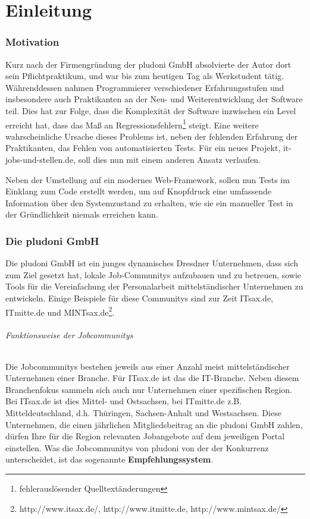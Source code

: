 \part{Einleitung}
\label{sec:intro}
\section{Motivation}

Kurz nach der Firmengründung der pludoni GmbH absolvierte der Autor dort sein Pflichtpraktikum, und war bis zum heutigen Tag als Werkstudent tätig.
Währenddessen nahmen Programmierer verschiedener Erfahrungsstufen und insbesondere auch Praktikanten an der Neu- und Weiterentwicklung der Software teil. Dies hat zur Folge, dass die Komplexität der Software inzwischen ein Level erreicht hat, dass das Maß an Regressionsfehlern\footnote{fehlerauslösender Quelltextänderungen} steigt. Eine weitere wahrscheinliche Ursache dieses Problems ist, neben der fehlenden Erfahrung der Praktikanten, das Fehlen von automatisierten Tests.
Für ein neues Projekt, it-jobs-und-stellen.de, soll dies nun mit einem anderen Ansatz verlaufen. 

Neben der Umstellung auf ein modernes Web-Framework, sollen nun Tests im Einklang zum Code erstellt werden, um auf Knopfdruck eine umfassende Information über den Systemzustand zu erhalten, wie sie ein manueller Test in der Gründlichkeit niemals erreichen kann.

\section{Die pludoni GmbH}

Die pludoni GmbH ist ein junges dynamisches Dresdner Unternehmen, dass sich zum Ziel gesetzt hat, lokale Job-Communitys aufzubauen und zu betreuen, sowie Tools für die Vereinfachung der Personalarbeit mittelständischer Unternehmen zu entwickeln. Einige Beispiele für diese Communitys sind zur Zeit ITsax.de, ITmitte.de und MINTsax.de\footnote{http://www.itsax.de/, http://www.itmitte.de, http://www.mintsax.de/}.

\paragraph{Funktionsweise der Jobcommunitys}
Die Jobcommunitys bestehen jeweils aus einer Anzahl meist mittelständischer Unternehmen einer Branche. Für ITsax.de ist das die IT-Branche. Neben diesem Branchenfokus sammeln sich auch nur Unternehmen einer spezifischen Region. Bei ITsax.de ist dies Mittel- und Ostsachsen, bei ITmitte.de z.B. Mitteldeutschland, d.h. Thüringen, Sachsen-Anhalt und Westsachsen. 
Diese Unternehmen, die einen jährlichen Mitgliedsbeitrag an die pludoni GmbH zahlen, dürfen Ihre für die Region relevanten Jobangebote auf dem jeweiligen Portal einstellen. Was die Jobcommunitys von pludoni von der der Konkurrenz unterscheidet, ist das sogenannte \textbf{Empfehlungssystem}. 

